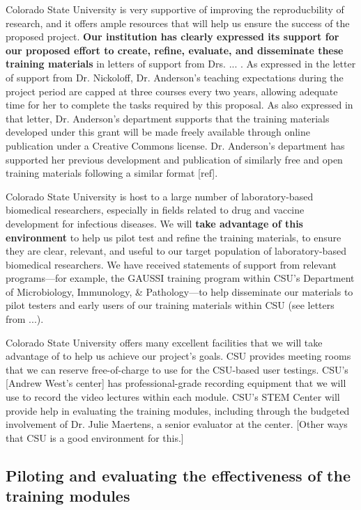 \documentclass[pdftex,english,11pt,parskip=half]{scrartcl}
\begin{document}
Colorado State University is very supportive of improving the reproducbility of research, and it offers ample resources that will help us ensure the success of the proposed project. \textbf{Our institution has clearly expressed its support for our proposed effort to create, refine, evaluate, and disseminate these training materials} in letters of support from Drs. ... . As expressed in the letter of support from Dr. Nickoloff, Dr. Anderson's teaching expectations during the project period are capped at three courses every two years, allowing adequate time for her to complete the tasks required by this proposal. As also expressed in that letter, Dr. Anderson's department supports that the training materials developed under this grant will be made freely available through online publication under a Creative Commons license. Dr. Anderson's department has supported her previous development and publication of similarly free and open training materials following a similar format [ref].

Colorado State University is host to a large number of laboratory-based biomedical researchers, especially in fields related to drug and vaccine development for infectious diseases. We will \textbf{take advantage of this environment} to help us pilot test and refine the training materials, to ensure they are clear, relevant, and useful to our target population of laboratory-based biomedical researchers. We have received statements of support from relevant programs---for example, the GAUSSI training program within CSU's Department of Microbiology, Immunology, \& Pathology---to help disseminate our materials to pilot testers and early users of our training materials within CSU (see letters from ...). 

Colorado State University offers many excellent facilities that we will take advantage of to help us achieve our project's goals. CSU provides meeting rooms that we can reserve free-of-charge to use for the CSU-based user testings. CSU's [Andrew West's center] has professional-grade recording equipment that we will use to record the video lectures within each module. CSU's STEM Center will provide help in evaluating the training modules, including through the budgeted involvement of Dr. Julie Maertens, a senior evaluator at the center. [Other ways that CSU is a good environment for this.]

\subsection{Piloting and evaluating the effectiveness of the training modules}
\end{document}
